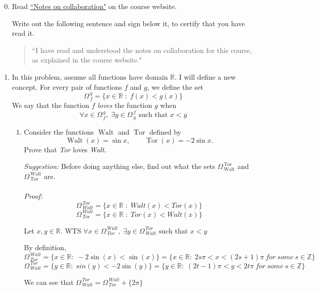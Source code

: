 \documentclass[12pt]{exam}
\newcommand{\vv}{\vspace{.2cm}}
\newcommand{\R}{\mathbb{R}}
\newcommand{\Z}{\mathbb{Z}}
\newcommand{\M}[2]{\Omega^{\, #2}_{\, #1}}
\DeclareMathOperator{\Walt}{Walt}
\DeclareMathOperator{\Tor}{Tor}
\begin{document}
\begin{enumerate}

\setcounter{enumi}{-1}

\item Read \href{https://www.math.toronto.edu/~alfonso/137/PS/137_2021_collaboration.pdf}{``Notes on collaboration"} on the course website.

	Write out the following sentence and sign below it, to certify that you have read it.
	
	\begin{quote}
		``I have read and understood the notes on collaboration for this course, as explained in the course website."
	\end{quote}

\vv
\newpage

\item  \label{likes}  In this problem, assume all functions have domain $\R$.  I will define a new concept.  For every pair of functions $f$ and $g$, we define the set
	$$
		\M{f}{g} = \{x \in \R \; : \; f(x) < g(x) \}
	$$ 
	We say that the function $f$ \emph{loves} the function $g$ when
	$$
		\forall x \in \M{f}{g}, \; \exists y \in \M{g}{f} \mbox{ such that } x < y
	$$

	\begin{enumerate}
		\item  Consider the functions $\Walt$ and $\Tor$ defined by
			$$
				\Walt(x) = \sin x, \quad \quad \Tor(x) = - 2\sin x.
			$$
		Prove that \emph{Tor} loves \emph{Walt}.
		
		\vv
		\emph{Suggestion:}  Before doing anything else, find out what the sets $\M{\Walt}{\Tor}$ and $\M{\Tor}{\Walt}$ are.\\
		\\
		\emph{Proof:}
		$$
		    \M{Walt}{Tor}=\{x \in \R \; : \; Walt(x) < Tor(x) \}
		$$
		$$
		    \M{Tor}{Walt}=\{x \in \R \; : \; Tor(x) < Walt(x) \}
		$$

		Let $x, y \in \R$. WTS $\forall x \in \M{Tor}{Walt}, \; \exists y \in \M{Walt}{Tor} \mbox{ such that } x < y$\\
		\vv
		
		By definition, 
		$$ 
			\M{Tor}{Walt} = \{x \in \R : \; - 2\sin(x) < \sin(x) \} = \{x \in \R : \; 2s\pi < x < (2s + 1)\pi\ for\ some\ s\in\Z\}
		$$
		$$ 
			\M{Walt}{Tor} = \{y \in \R : \; sin(y) < - 2\sin(y) \} = \{y \in \R: \; (2t - 1)\pi < y < 2t\pi\ for\ some\ s\in\Z\}
		$$

		We can see that $\M{Walt}{Tor}=\M{Tor}{Walt} + \{2\pi\}$


\end{enumerate}
\end{enumerate}
\end{document}
